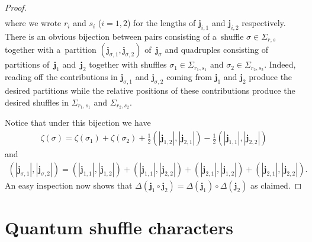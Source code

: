 \documentclass[11pt]{article}
\numberwithin{equation}{section}
\begin{document}
\begin{proof}
\begin{gather*}
\end{gather*}
where we wrote $r_i$ and $s_i$ ($i=1,2$) for the lengths of $\mathbf{j}_{i,1}$ and $\mathbf{j}_{i,2}$ respectively.
There is an obvious bijection between pairs consisting of a~shuf\/f\/le $\sigma\in\Sigma_{r,s}$ together with a~partition
$(\mathbf{j}_{\sigma,1},\mathbf{j}_{\sigma,2})$ of~$\mathbf{j}_\sigma$ and quadruples consisting of partitions of~$\mathbf{j}_1$ and~$\mathbf{j}_2$ together with shuf\/f\/les $\sigma_1\in\Sigma_{r_1,s_1}$ and
$\sigma_2\in\Sigma_{r_2,s_2}$.
Indeed, reading of\/f the contributions in $\mathbf{j}_{\sigma,1}$ and $\mathbf{j}_{\sigma,2}$ coming from $\mathbf{j}_1$
and $\mathbf{j}_2$ produce the desired partitions while the relative positions of these contributions produce the
desired shuf\/f\/les in $\Sigma_{r_1,s_1}$ and $\Sigma_{r_2,s_2}$.

Notice that under this bijection we have
\begin{gather*}
\zeta(\sigma)=\zeta(\sigma_1)+\zeta(\sigma_2)+\frac{1}{2}(|\mathbf{j}_{1,2}|,|\mathbf{j}_{2,1}|)-\frac{1}{2}(|\mathbf{j}_{1,1}|,|\mathbf{j}_{2,2}|)
\end{gather*}
and
\begin{gather*}
(|\mathbf{j}_{\sigma,1}|,|\mathbf{j}_{\sigma,2}|)
=(|\mathbf{j}_{1,1}|,|\mathbf{j}_{1,2}|)+(|\mathbf{j}_{1,1}|,|\mathbf{j}_{2,2}|)
+(|\mathbf{j}_{2,1}|,|\mathbf{j}_{1,2}|)+(|\mathbf{j}_{2,1}|,|\mathbf{j}_{2,2}|).
\end{gather*}
An easy inspection now shows that $\Delta(\mathbf{j}_1\circ\mathbf{j}_2)=\Delta(\mathbf{j}_1)\circ\Delta(\mathbf{j}_2)$
as claimed.
\end{proof}
\setcounter{section}{6}
\setcounter{subsection}{1}
\setcounter{subsubsection}{0}
\setcounter{Theorem}{12}
\setcounter{equation}{2}
\section{Quantum shuf\/f\/le characters}\label{sec:shuffle_character}
\end{document}
